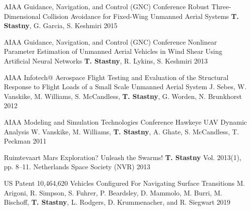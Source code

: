 \begin{cventries}
\cvpubentry
	{AIAA Guidance, Navigation, and Control (GNC) Conference} %
	{Robust Three-Dimensional Collision Avoidance for Fixed-Wing Unmanned Aerial Systems} %
	{\textbf{T. Stastny}, G. Garcia, S. Keshmiri} %
	{} %
	{2015} %
	{} %
	{} %
	
\cvpubentry
	{AIAA Guidance, Navigation, and Control (GNC) Conference} %
	{Nonlinear Parameter Estimation of Unmanned Aerial Vehicles in Wind Shear Using Artificial Neural Networks} %
	{\textbf{T. Stastny}, R. Lykins, S. Keshmiri} %
	{} %
	{2013} %
	{} %
	{} %
		
\cvpubentry
	{AIAA Infotech@ Aerospace} %
	{Flight Testing and Evaluation of the Structural Response to Flight Loads of a Small Scale Unmanned Aerial System} %
	{J. Sebes, W. Vanskike, M. Williams, S. McCandless, \textbf{T. Stastny}, G. Worden, N. Brunkhorst} %
	{} %
	{2012} %
	{} %
	{} %

\cvpubentry
	{AIAA Modeling and Simulation Technologies Conference} %
	{Hawkeye UAV Dynamic Analysis} %
	{W. Vanskike, M. Williams, \textbf{T. Stastny}, A. Ghate, S. McCandless, T. Peckman} %
	{} %
	{2011} %
	{} %
	{} %


\begin{flushleft}
\end{flushleft}
	
\cvpubentry
	{Ruimtevaart} %
	{Mars Exploration? Unleash the Swarms!} %
	{\textbf{T. Stastny}} %
	{Vol. 2013(1), pp. 8--11. Netherlands Space Society (NVR)} %
	{2013} %
	{} %
	{} %
	

\begin{flushleft}
\end{flushleft}

\cvpubentry
	{US Patent 10,464,620} %
	{Vehicles Configured For Navigating Surface Transitions} %
	{M. Arigoni, R. Simpson, S. Fuhrer, P. Beardsley, D. Mammolo, M. Burri, M. Bischoff, \textbf{T. Stastny}, L. Rodgers, D. Krummenacher, and R. Siegwart} %
	{} %
	{2019} %
	{} %
	{} %

\end{cventries}
